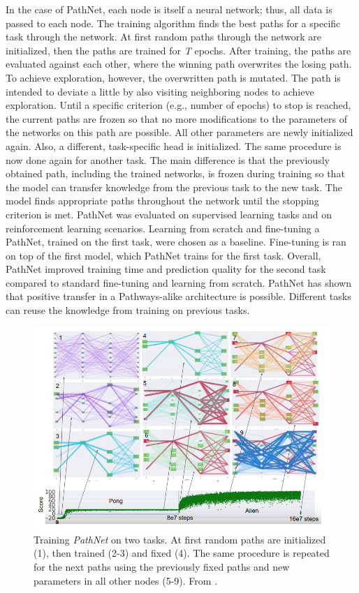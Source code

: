 \documentclass[
]{krantz}
\begin{document}
In the case of PathNet, each node is itself a neural network; thus, all data is passed to each node. The training algorithm finds the best paths for a specific task through the network. At first random paths through the network are initialized, then the paths are trained for \emph{T} epochs. After training, the paths are evaluated against each other, where the winning path overwrites the losing path. To achieve exploration, however, the overwritten path is mutated. The path is intended to deviate a little by also visiting neighboring nodes to achieve exploration. Until a specific criterion (e.g., number of epochs) to stop is reached, the current paths are frozen so that no more modifications to the parameters of the networks on this path are possible. All other parameters are newly initialized again. Also, a different, task-specific head is initialized. The same procedure is now done again for another task. The main difference is that the previously obtained path, including the trained networks, is frozen during training so that the model can transfer knowledge from the previous task to the new task. The model finds appropriate paths throughout the network until the stopping criterion is met. PathNet was evaluated on supervised learning tasks and on reinforcement learning scenarios. Learning from scratch and fine-tuning a PathNet, trained on the first task, were chosen as a baseline. Fine-tuning is ran on top of the first model, which PathNet trains for the first task. Overall, PathNet improved training time and prediction quality for the second task compared to standard fine-tuning and learning from scratch. PathNet has shown that positive transfer in a Pathways-alike architecture is possible. Different tasks can reuse the knowledge from training on previous tasks.

\begin{figure}

{\centering \includegraphics[width=0.8\linewidth]{figures/03-03-multipurpose/PathNet} 

}

\caption{Training \emph{PathNet} on two tasks. At first random paths are initialized (1), then trained (2-3) and fixed (4). The same procedure is repeated for the next paths using the previously fixed paths and new parameters in all other nodes (5-9). From \citet{Fernando2017}.}\label{fig:pathnet}
\end{figure}
\end{document}
